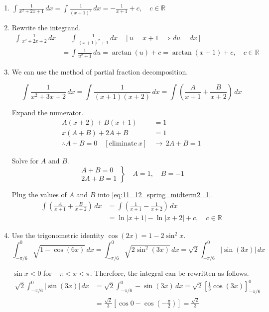 \documentclass[a4paper, 12pt]{article}
\begin{document}
\begin{enumerate}[leftmargin=*,label=\textbf{\arabic*.}]
\begin{enumerate}[leftmargin=*,label=\textbf{\alph*.}]
\item $\displaystyle\int\frac1{x^2+2x+1}\,dx=\int\frac1{(x+1)^2}\,dx=\boxed{-\frac1{x+1}+c, \quad c\in\mathbb{R}}$

\item Rewrite the integrand.
\begin{align*}\int\frac1{x^2+2x+2}\,dx&=\int\frac1{(x+1)^2+1}\,dx\quad\left[u=x+1\implies du=dx\right]\\[1em]&=\int\frac1{u^2+1}\,du=\arctan(u)+c=\boxed{\arctan(x+1) +c,\quad c\in\mathbb{R}}\end{align*}

\item We can use the method of partial fraction decomposition.

\begin{equation}\int\frac1{x^2+3x+2}\,dx=\int\frac1{(x+1)(x+2)}\,dx=\int\left(\frac A{x+1}+\frac B{x+2}\right)\,dx\label{eq:11_12_spring_midterm2_1}\end{equation}

Expand the numerator.
\begin{align*}
A(x+2)+B(x+1)&=1\\
x(A+B)+2A+B&=1\\
\therefore A+B=0\quad[\text{eliminate}\ x]\,&\rightarrow\,2A+B=1
\end{align*}

Solve for $A$ and $B$.
\[
\left.
\begin{array}{ll}
A+B=0\\
\displaystyle2A+B=1
\end{array}
\right\}
\quad A=1,\quad B=-1
\]

Plug the values of $A$ and $B$ into \eqref{eq:11_12_spring_midterm2_1}.
\begin{align*}
\int\left(\frac{A}{x+1}+\frac{B}{x+2}\right)\,dx
&= \int\left(\frac{1}{x+1}-\frac{1}{x+2}\right)\,dx \\[1em]
&= \boxed{\ln\left|x+1\right|-\ln\left|x+2\right|+c,\quad c\in\mathbb{R}}
\end{align*}

\item Use the trigonometric identity $\cos(2x)=1-2\sin^2x$.
\[\int_{-\pi/6}^0\sqrt{1-\cos(6x)}\,dx=\int_{-\pi/6}^0\sqrt{2\sin^2(3x)}\,dx=\sqrt2\int_{-\pi/6}^0\left|\sin(3x)\right|\,dx\]

$\sin x<0$ for $-\pi<x<\pi$. Therefore, the integral can be rewritten as follows.
\begin{align*}\sqrt2\int_{-\pi/6}^0\left|\sin(3x)\right|\,dx&=\sqrt2\int_{-\pi/6}^0-\sin(3x)\,dx=\sqrt2\left[\frac13\cos(3x)\right]_{-\pi/6}^0\\[1em]&=\frac{\sqrt2}3\left[\cos0-\cos\left(-\frac\pi2\right)\right]=\boxed{\frac{\sqrt2}3}\end{align*}
\end{enumerate}


\end{enumerate}
\end{document}
